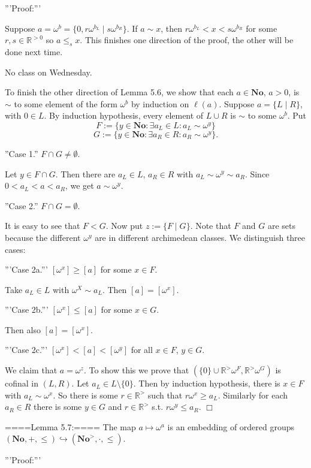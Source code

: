 '''Proof:'''

Suppose $a=\omega^b=\{0,r\omega^{b_L}\mid s\omega^{b_R}\}$. If $a\sim x$, then $r\omega^{b_L}<x<s\omega^{b_R}$ for some $r,s\in\mathbb{R}^{>0}$ so $a\le_s x$. This finishes one direction of the proof, the other will be done next time.

No class on Wednesday. 

To finish the other direction of Lemma 5.6, we show that each $a\in\mathbf{No}$, $a>0$, is $\sim$ to some element of the form $\omega^b$ by induction on $\ell(a)$. Suppose $a=\{L\mid R\}$, with $0\in L$. By induction hypothesis, every element of $L\cup R$ is $\sim$ to some $\omega^b$. Put
$$F:=\{y\in\mathbf{No}:\exists a_L\in L:a_L\sim \omega^y\}$$
$$G:=\{y\in\mathbf{No}:\exists a_R\in R:a_R\sim \omega^y\}.$$

''Case 1.'' $F\cap G\neq \emptyset$. 

Let $y\in F\cap G$. Then there are $a_L\in L$, $a_R\in R$ with $a_L\sim\omega^y\sim a_R$. Since $0<a_L<a<a_R$, we get $a\sim \omega^y$.

''Case 2.'' $F\cap G=\emptyset$. 

It is easy to see that $F<G$. Now put $z:=\{F\mid G\}$. Note that $F$ and $G$ are sets because the different $\omega^y$ are in different archimedean classes. We distinguish three cases:

'''Case 2a.''' $[\omega^x]\ge [a]$ for some $x\in F$.

Take $a_L\in L$ with $\omega^X\sim a_L$. Then $[a]=[\omega^x]$.

'''Case 2b.''' $[\omega^x]\le [a]$ for some $x\in G$.

Then also $[a]=[\omega^x]$.

'''Case 2c.''' $[\omega^x]<[a]<[\omega^y]$ for all $x\in F$, $y\in G$.

We claim that $a=\omega^z$. To show this we prove that $(\{0\}\cup \mathbb{R}^> \omega^F, \mathbb{R}^>\omega^G)$ is cofinal in $(L,R)$. Let $a_L \in L\setminus \{0\}$. Then by induction hypothesis, there is $x\in F$ with $a_L\sim \omega^x$. So there is some $r\in \mathbb{R}^>$ such that $r\omega^x\ge a_L$. Similarly for each $a_R\in R$ there is some $y\in G$ and $r\in \mathbb{R}^>$ s.t. $r\omega^y\le a_R$. $\Box$

====Lemma 5.7:==== 
The map $a\mapsto \omega^a$ is an embedding of ordered groups $(\mathbf{No},+,\le)\hookrightarrow (\mathbf{No}^>,\cdot,\le)$.

'''Proof:''' 

